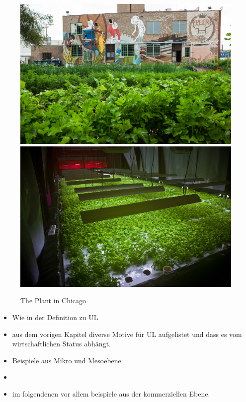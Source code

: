 \documentclass{scrartcl}
\begin{document}
\begin{figure}[htbp]
    \centering
    \includegraphics[width=14cm]{image_folder/the_plant_1.jpg}
    \includegraphics[width=14cm]{image_folder/the_plant_2.jpg}
  \caption{The Plant in Chicago} 
\end{figure} 


\begin{itemize}
\item Wie in der Definition zu UL 
\item aus dem vorigen Kapitel diverse Motive für UL aufgelistet und dass es vom wirtschaftlichen Status abhängt. 
\item Beispiele aus Mikro und Mesoebene 
\item 
\item im folgendenen vor allem beispiele aus der kommerziellen Ebene. 
\end{itemize}
\end{document}
